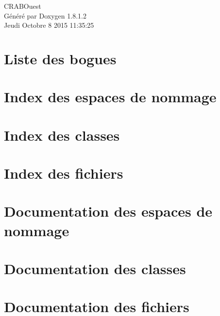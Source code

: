 \documentclass{book}
\begin{document}
\hypersetup{pageanchor=false,citecolor=blue}
\begin{titlepage}
\vspace*{7cm}
\begin{center}
{\Large C\-R\-A\-B\-Ouest }\\
\vspace*{1cm}
{\large Généré par Doxygen 1.8.1.2}\\
\vspace*{0.5cm}
{\small Jeudi Octobre 8 2015 11:35:25}\\
\end{center}
\end{titlepage}
\clearemptydoublepage
{}
\tableofcontents
\clearemptydoublepage
{}
\hypersetup{pageanchor=true,citecolor=blue}
\chapter{Liste des bogues}
\label{bug}
\hypertarget{bug}{}

\chapter{Index des espaces de nommage}

\chapter{Index des classes}

\chapter{Index des fichiers}

\chapter{Documentation des espaces de nommage}

\chapter{Documentation des classes}



\chapter{Documentation des fichiers}







\printindex
\end{document}
